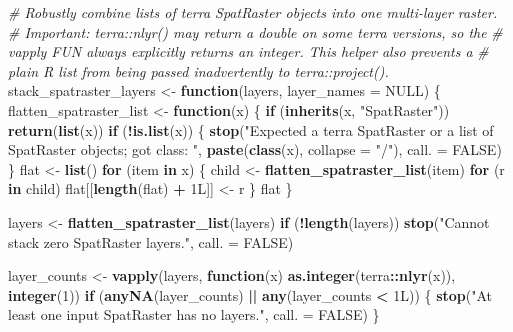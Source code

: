 \documentclass[
]{article}
\newenvironment{Shaded}{\begin{snugshade}}{\end{snugshade}}
\newcommand{\AttributeTok}[1]{\textcolor[rgb]{0.13,0.29,0.53}{#1}}
\newcommand{\CommentTok}[1]{\textcolor[rgb]{0.56,0.35,0.01}{\textit{#1}}}
\newcommand{\ConstantTok}[1]{\textcolor[rgb]{0.56,0.35,0.01}{#1}}
\newcommand{\ControlFlowTok}[1]{\textcolor[rgb]{0.13,0.29,0.53}{\textbf{#1}}}
\newcommand{\DataTypeTok}[1]{\textcolor[rgb]{0.13,0.29,0.53}{#1}}
\newcommand{\DecValTok}[1]{\textcolor[rgb]{0.00,0.00,0.81}{#1}}
\newcommand{\FunctionTok}[1]{\textcolor[rgb]{0.13,0.29,0.53}{\textbf{#1}}}
\newcommand{\NormalTok}[1]{#1}
\newcommand{\OtherTok}[1]{\textcolor[rgb]{0.56,0.35,0.01}{#1}}
\newcommand{\SpecialCharTok}[1]{\textcolor[rgb]{0.81,0.36,0.00}{\textbf{#1}}}
\newcommand{\StringTok}[1]{\textcolor[rgb]{0.31,0.60,0.02}{#1}}
\begin{document}
\begin{Shaded}
\begin{Highlighting}[]
\CommentTok{\# Robustly combine lists of terra SpatRaster objects into one multi{-}layer raster.}
\CommentTok{\# Important: terra::nlyr() may return a double on some terra versions, so the}
\CommentTok{\# vapply FUN always explicitly returns an integer. This helper also prevents a}
\CommentTok{\# plain R list from being passed inadvertently to terra::project().}
\NormalTok{stack\_spatraster\_layers }\OtherTok{\textless{}{-}} \ControlFlowTok{function}\NormalTok{(layers, }\AttributeTok{layer\_names =} \ConstantTok{NULL}\NormalTok{) \{}
\NormalTok{  flatten\_spatraster\_list }\OtherTok{\textless{}{-}} \ControlFlowTok{function}\NormalTok{(x) \{}
    \ControlFlowTok{if}\NormalTok{ (}\FunctionTok{inherits}\NormalTok{(x, }\StringTok{"SpatRaster"}\NormalTok{)) }\FunctionTok{return}\NormalTok{(}\FunctionTok{list}\NormalTok{(x))}
    \ControlFlowTok{if}\NormalTok{ (}\SpecialCharTok{!}\FunctionTok{is.list}\NormalTok{(x)) \{}
      \FunctionTok{stop}\NormalTok{(}\StringTok{"Expected a terra SpatRaster or a list of SpatRaster objects; got class: "}\NormalTok{,}
           \FunctionTok{paste}\NormalTok{(}\FunctionTok{class}\NormalTok{(x), }\AttributeTok{collapse =} \StringTok{"/"}\NormalTok{), }\AttributeTok{call. =} \ConstantTok{FALSE}\NormalTok{)}
\NormalTok{    \}}
\NormalTok{    flat }\OtherTok{\textless{}{-}} \FunctionTok{list}\NormalTok{()}
    \ControlFlowTok{for}\NormalTok{ (item }\ControlFlowTok{in}\NormalTok{ x) \{}
\NormalTok{      child }\OtherTok{\textless{}{-}} \FunctionTok{flatten\_spatraster\_list}\NormalTok{(item)}
      \ControlFlowTok{for}\NormalTok{ (r }\ControlFlowTok{in}\NormalTok{ child) flat[[}\FunctionTok{length}\NormalTok{(flat) }\SpecialCharTok{+} \DecValTok{1}\DataTypeTok{L}\NormalTok{]] }\OtherTok{\textless{}{-}}\NormalTok{ r}
\NormalTok{    \}}
\NormalTok{    flat}
\NormalTok{  \}}

\NormalTok{  layers }\OtherTok{\textless{}{-}} \FunctionTok{flatten\_spatraster\_list}\NormalTok{(layers)}
  \ControlFlowTok{if}\NormalTok{ (}\SpecialCharTok{!}\FunctionTok{length}\NormalTok{(layers)) }\FunctionTok{stop}\NormalTok{(}\StringTok{"Cannot stack zero SpatRaster layers."}\NormalTok{, }\AttributeTok{call. =} \ConstantTok{FALSE}\NormalTok{)}

\NormalTok{  layer\_counts }\OtherTok{\textless{}{-}} \FunctionTok{vapply}\NormalTok{(layers, }\ControlFlowTok{function}\NormalTok{(x) }\FunctionTok{as.integer}\NormalTok{(terra}\SpecialCharTok{::}\FunctionTok{nlyr}\NormalTok{(x)), }\FunctionTok{integer}\NormalTok{(}\DecValTok{1}\NormalTok{))}
  \ControlFlowTok{if}\NormalTok{ (}\FunctionTok{anyNA}\NormalTok{(layer\_counts) }\SpecialCharTok{||} \FunctionTok{any}\NormalTok{(layer\_counts }\SpecialCharTok{\textless{}} \DecValTok{1}\DataTypeTok{L}\NormalTok{)) \{}
    \FunctionTok{stop}\NormalTok{(}\StringTok{"At least one input SpatRaster has no layers."}\NormalTok{, }\AttributeTok{call. =} \ConstantTok{FALSE}\NormalTok{)}
\NormalTok{  \}}


\end{Highlighting}
\end{Shaded}
\end{document}
